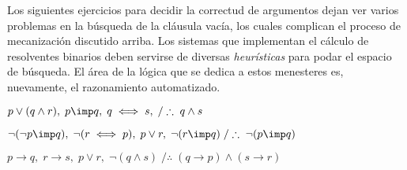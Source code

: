 \documentclass[11pt,letterpaper]{article}
\begin{document}
Los siguientes ejercicios para decidir la correctud de argumentos dejan ver 
varios problemas en la búsqueda de la cláusula vacía, los cuales complican el 
proceso de mecanización discutido arriba. Los sistemas que implementan el 
cálculo de resolventes binarios deben servirse de diversas \textit{heurísticas} 
para podar el espacio de búsqueda. El área de la lógica que se dedica a estos 
menesteres es, nuevamente, el razonamiento automatizado.

\bi
\item $p\lor (q\land r),\; p\imp q,\;q\iff s,\;/\therefore\; q\land s$
\item $\neg (\neg p\imp q),\;\neg (r\iff p),\;p\lor r,\;\neg (r\imp 
q)\;/\therefore\; \neg (p\imp q)$
\item $p\to q,\;r\to s,\;p\lor r,\;\neg (q\land s)\;/\therefore\;(q\to 
p)\land(s\to r)$
\ei
\end{document}
